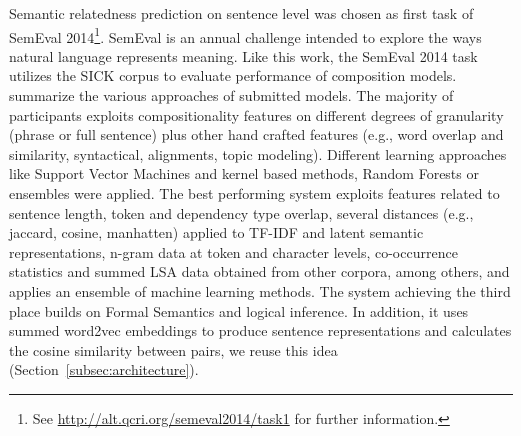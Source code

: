 Semantic relatedness prediction on sentence level was chosen as first task of SemEval 2014\footnote{See \url{http://alt.qcri.org/semeval2014/task1} for further information.}. SemEval is an annual challenge intended to explore the ways natural language represents meaning. Like this work, the SemEval 2014 task utilizes the SICK \autocite{marelli_sick_2014} corpus to evaluate performance of composition models. \textcite{marelli_semeval-2014_2014} summarize the various approaches of submitted models. The majority of participants exploits compositionality features on different degrees of granularity (phrase or full sentence) plus other hand crafted features (e.g., word overlap and similarity, syntactical, alignments, topic modeling). Different learning approaches like Support Vector Machines \autocite{cortes_support-vector_1995} and kernel based methods, Random Forests \autocite{breiman_random_2001} or ensembles \autocite{opitz_popular_1999} were applied. The best performing system \autocite{zhao_ecnu_2014} exploits features related to sentence length, token and dependency type overlap, several distances (e.g., jaccard, cosine, manhatten) applied to \ac{TF-IDF} and latent semantic representations, n-gram data at token and character levels, co-occurrence statistics and summed \ac{LSA} data obtained from other corpora, among others, and applies an ensemble of machine learning methods. The system achieving the third place \autocite{bjerva_meaning_2014} builds on Formal Semantics and logical inference. In addition, it uses summed word2vec \autocite{mikolov_distributed_2013} embeddings to produce sentence representations and calculates the cosine similarity between pairs, we reuse this idea (Section~\ref{subsec:architecture}).


